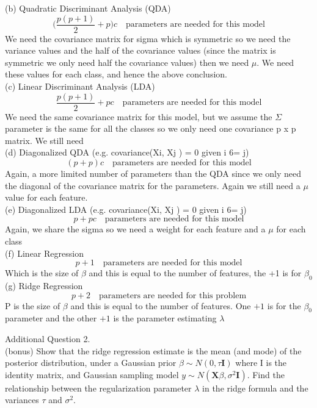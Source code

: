 \documentclass[draft]{exam} %
\theoremstyle{definition} \newtheorem*{defn}{Definition}
\begin{document}
\begin{questions}
\begin{solution}
(b) Quadratic Discriminant Analysis (QDA) \\
$$\Big(\frac{p(p+1)}{2}+ p \Big)c \quad \text{parameters are needed for this model}$$
We need the covariance matrix for sigma which is symmetric so we need the variance values and the half of the covariance values (since the matrix is symmetric we only need half the covariance values) then we need $\mu$.  We need these values for each class, and hence the above conclusion.\\

(c) Linear Discriminant Analysis (LDA) \\
$$\frac{p(p+1)}{2}+ p c \quad \text{parameters are needed for this model}$$
We need the same covariance matrix for this model, but we assume the $\Sigma$ parameter is the same for all the classes so we only need one covariance p x p matrix.  We still need\\

(d) Diagonalized QDA (e.g. covariance(Xi, Xj ) = 0 given i 6= j) \\
$$(p + p)c \quad \text{parameters are needed for this model}$$
Again, a more limited number of parameters than the QDA since we only need the diagonal of the covariance matrix for the parameters.  Again we still need a $\mu$ value for each feature.\\

(e) Diagonalized LDA (e.g. covariance(Xi, Xj ) = 0 given i 6= j) \\
$$p + p c \quad \text{parameters are needed for this model}$$
Again, we share the sigma so we need a weight for each feature and a $\mu$ for each class\\

(f) Linear Regression \\
$$p+1 \quad \text{parameters are needed for this model}$$
Which is the size of $\beta$ and this is equal to the number of features, the +1 is for $\beta_0$\\

(g) Ridge Regression \\
$$p+2 \quad \text{parameters are needed for this problem}$$
P is the size of $\beta$ and this is equal to the number of features.  One $+1$ is for the $\beta_0$ parameter and the other $+1$ is the parameter estimating $\lambda$

\end{solution}


\question Additional Question 2. \\
(bonus) Show that the ridge regression estimate is the mean (and mode) of the posterior distribution, under a Gaussian prior $\beta \sim N (0, \tau \pmb{I})$ where I is the identity matrix, and Gaussian sampling model $y \sim N (\pmb{X}\beta, \sigma^2\pmb{I})$. Find the relationship between the regularization parameter $\lambda$ in the ridge formula and the variances $\tau$ and $\sigma^2$. \\


\end{questions}
\end{document}
